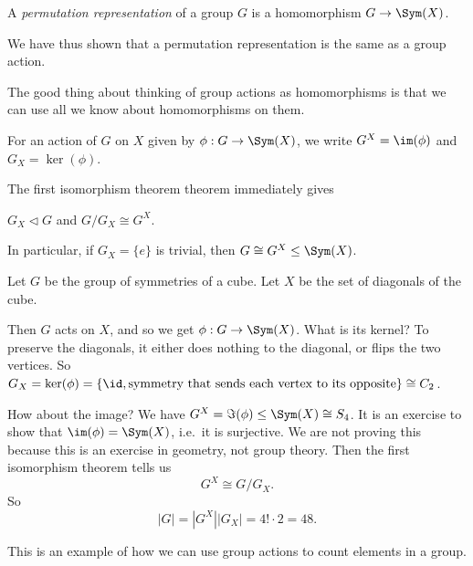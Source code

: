\documentclass[a4paper]{article}
\begin{document}
\begin{defi}
  A \emph{permutation representation} of a group $G$ is a homomorphism $G \to \Sym (X)$.
\end{defi}
We have thus shown that a permutation representation is the same as a group action.

The good thing about thinking of group actions as homomorphisms is that we can use all we know about homomorphisms on them.
\begin{notation}
  For an action of $G$ on $X$ given by $\phi: G \to \Sym(X)$, we write $G^X = \im(\phi)$ and $G_X = \ker(\phi)$.
\end{notation}

The first isomorphism theorem theorem immediately gives
\begin{prop}
  $G_X \lhd G$ and $G/G_X \cong G^X$.
\end{prop}

In particular, if $G_X = \{e\}$ is trivial, then $G \cong G^X \leq \Sym(X)$.

\begin{eg}
  Let $G$ be the group of symmetries of a cube. Let $X$ be the set of diagonals of the cube.
  \begin{center}
  \end{center}
  Then $G$ acts on $X$, and so we get $\phi: G \to \Sym(X)$. What is its kernel? To preserve the diagonals, it either does nothing to the diagonal, or flips the two vertices. So $G_X = \ker(\phi) = \{\id, \text{symmetry that sends each vertex to its opposite}\} \cong C_2$.

  How about the image? We have $G^X = \Im(\phi) \leq \Sym(X) \cong S_4$. It is an exercise to show that $\im(\phi) = \Sym(X)$, i.e.\ it is surjective. We are not proving this because this is an exercise in geometry, not group theory. Then the first isomorphism theorem tells us
  \[
    G^X \cong G/G_X.
  \]
  So
  \[
    |G| = |G^X| |G_X| = 4! \cdot 2 = 48.
  \]
\end{eg}
This is an example of how we can use group actions to count elements in a group.
\end{document}
